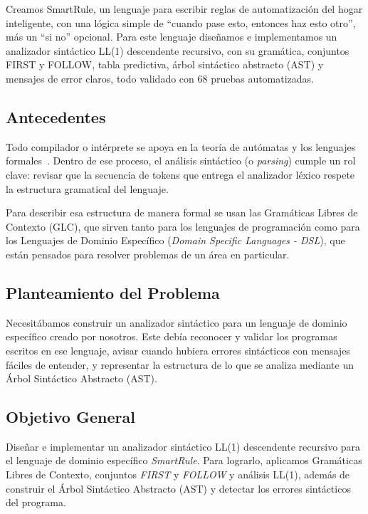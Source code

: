 \documentclass[12pt,a4paper]{article}
\begin{document}
Creamos SmartRule, un lenguaje para escribir reglas de automatización del hogar inteligente, con una lógica simple de ``cuando pase esto, entonces haz esto otro'', más un ``si no'' opcional. Para este lenguaje diseñamos e implementamos un analizador sintáctico LL(1) descendente recursivo, con su gramática, conjuntos FIRST y FOLLOW, tabla predictiva, árbol sintáctico abstracto (AST) y mensajes de error claros, todo validado con 68 pruebas automatizadas.

\subsection{Antecedentes}
Todo compilador o intérprete se apoya en la teoría de autómatas y los lenguajes formales~\cite{brena}. Dentro de ese proceso, el análisis sintáctico (o \textit{parsing}) cumple un rol clave: revisar que la secuencia de tokens que entrega el analizador léxico respete la estructura gramatical del lenguaje.

Para describir esa estructura de manera formal se usan las Gramáticas Libres de Contexto (GLC), que sirven tanto para los lenguajes de programación como para los Lenguajes de Dominio Específico (\textit{Domain Specific Languages - DSL}), que están pensados para resolver problemas de un área en particular.

\subsection{Planteamiento del Problema}
Necesitábamos construir un analizador sintáctico para un lenguaje de dominio específico creado por nosotros. Este debía reconocer y validar los programas escritos en ese lenguaje, avisar cuando hubiera errores sintácticos con mensajes fáciles de entender, y representar la estructura de lo que se analiza mediante un Árbol Sintáctico Abstracto (AST).

\subsection{Objetivo General}
Diseñar e implementar un analizador sintáctico LL(1) descendente recursivo para el lenguaje de dominio específico \textit{SmartRule}. Para lograrlo, aplicamos Gramáticas Libres de Contexto, conjuntos \textit{FIRST} y \textit{FOLLOW} y análisis LL(1), además de construir el Árbol Sintáctico Abstracto (AST) y detectar los errores sintácticos del programa.
\end{document}
